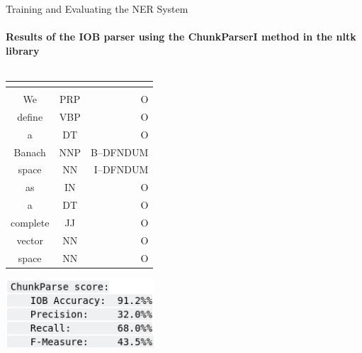 \documentclass[10pt]{beamer}
\begin{document}
\begin{frame}{Training and Evaluating the NER System} 
    \framesubtitle{Results of the IOB parser using the ChunkParserI method in the \textbf{nltk} library}
    \begin{columns}[T]
        \begin{column}{0.5\textwidth}
            \begin{tabular}{|c|c|r|}
                \hline
                \hline
        \multicolumn{2}{|c|}{\color{blue}{Input}} & \color{purple}{Output} \\
                \hline
                \hline
                \color{blue}{Token} & \color{blue}{POS} & \color{purple}{NER}\\
                \hline
                  We&PRP&O\\
                  \hline
                  define&VBP&O\\
                  \hline
                  a&DT&O\\
                  \hline
                  Banach&NNP&B--DFNDUM\\
                  \hline
                  space&NN&I--DFNDUM\\
                  \hline
                  as&IN&O\\
                  \hline
                  a&DT&O\\
                  \hline
                  complete&JJ&O\\
                  \hline
                  vector&NN&O\\
                  \hline
                  space&NN&O\\
                  \hline
            \end{tabular}
    \includegraphics[width=0.6\textwidth]{BIO_stats.png}
        \end{column}
        \begin{column}{0.5\textwidth}
            
        \end{column}
    \end{columns}
\end{frame}
\end{document}
